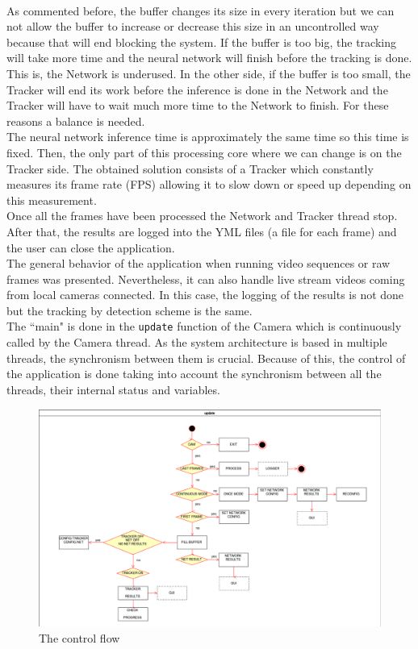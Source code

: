 \\As commented before, the buffer changes its size in every iteration but we can not allow the buffer to increase or decrease this size in an uncontrolled way because that will end blocking the system. If the buffer is too big, the tracking will take more time and the neural network will finish before the tracking is done. This is, the Network is underused. In the other side, if the buffer is too small, the Tracker will end its work before the inference is done in the Network and the Tracker will have to wait much more time to the Network to finish. For these reasons a balance is needed.\\
The neural network inference time is approximately the same time so this time is fixed. Then, the only part of this processing core where we can change is on the Tracker side. The obtained solution consists of a Tracker which constantly measures its frame rate (FPS) allowing it to slow down or speed up depending on this measurement.\\
Once all the frames have been processed the Network and Tracker thread stop. After that, the results are logged into the YML files (a file for each frame) and the user can close the application.\\
The general behavior of the application when running video sequences or raw frames was presented. Nevertheless, it can also handle live stream videos coming from local cameras connected. In this case, the logging of the results is not done but the tracking by detection scheme is the same.\\
The ``main" is done in the \texttt{update} function of the Camera which is continuously called by the Camera thread. As the system architecture is based in multiple threads, the synchronism between them is crucial. Because of this, the control of the application is done taking into account the synchronism between all the threads, their internal status and variables.
\begin{figure}[H]
\begin{center}
\includegraphics[scale=0.3]{figures/update_camera.png}
\caption{The control flow}
\label{fig:update_cam}
\end{center}
\end{figure} 


